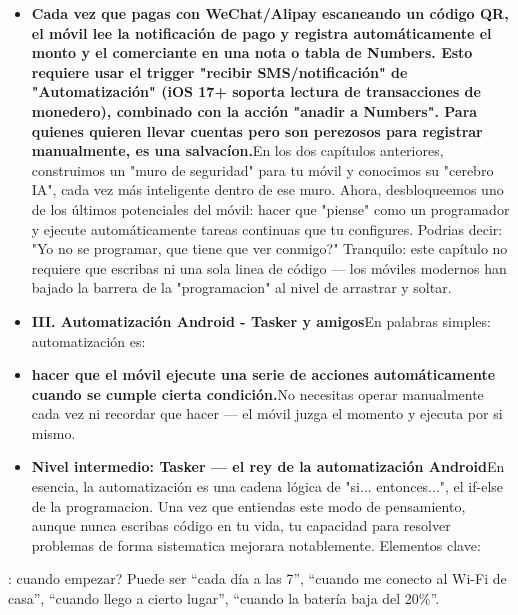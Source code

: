 \begin{itemize}
  \item \textbf{Cada vez que pagas con WeChat/Alipay escaneando un código QR, el móvil lee la notificación de pago y registra automáticamente el monto y el comerciante en una nota o tabla de Numbers. Esto requiere usar el trigger "recibir SMS/notificación" de "Automatización" (iOS 17+ soporta lectura de transacciones de monedero), combinado con la acción "anadir a Numbers". Para quienes quieren llevar cuentas pero son perezosos para registrar manualmente, es una salvacíon.}En los dos capítulos anteriores, construimos un "muro de seguridad" para tu móvil y conocimos su "cerebro IA", cada vez más inteligente dentro de ese muro. Ahora, desbloqueemos uno de los últimos potenciales del móvil: hacer que "piense" como un programador y ejecute automáticamente tareas continuas que tu configures. Podrias decir: "Yo no se programar, que tiene que ver conmigo?" Tranquilo: este capítulo no requiere que escribas ni una sola linea de código — los móviles modernos han bajado la barrera de la "programacion" al nivel de arrastrar y soltar.
  \item \textbf{III. Automatización Android - Tasker y amigos}En palabras simples: automatización es:
  \item \textbf{hacer que el móvil ejecute una serie de acciones automáticamente cuando se cumple cierta condición.}No necesitas operar manualmente cada vez ni recordar que hacer — el móvil juzga el momento y ejecuta por si mismo.
  \item \textbf{Nivel intermedio: Tasker — el rey de la automatización Android}En esencia, la automatización es una cadena lógica de "si... entonces...", el if-else de la programacion. Una vez que entiendas este modo de pensamiento, aunque nunca escribas código en tu vida, tu capacidad para resolver problemas de forma sistematica mejorara notablemente. Elementos clave:
\end{itemize}


: cuando empezar? Puede ser “cada día a las 7”, “cuando me conecto al Wi-Fi de casa”, “cuando llego a cierto lugar”, “cuando la batería baja del 20\%”.

